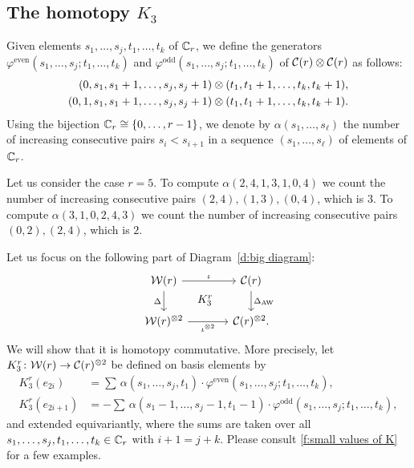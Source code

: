 \subsection{The homotopy $K_3$}\label{ss:coproduct}
\begin{definition}
    Given elements $s_1,\dots,s_j,t_1,\dots,t_k$ of $\mathbb{C}_r$, we define the generators $\varphi^{\mathrm{even}}(s_1,\dots,s_j;t_1,\dots,t_k)$ and $\varphi^{\mathrm{odd}}(s_1,\dots,s_j;t_1,\dots,t_k)$ of $\mathcal{C}(r) \otimes \mathcal{C}(r)$ as follows:
\begin{align*}
 (0,s_1,s_1+1,\dots,s_j,s_j+1) &\otimes
(t_1,t_1+1,\dots,t_k,t_k+1),
\\
(0,1,s_1,s_1+1,\dots,s_j,s_j+1)&\otimes (t_1,t_1+1,\dots,t_k,t_k+1).
\end{align*}
Using the bijection $\mathbb{C}_r \cong \{0,\dots,r-1\}$, we denote by $\alpha(s_1,\dots,s_\ell)$ the number of increasing consecutive pairs $s_i < s_{i+1}$ in a sequence $(s_1,\ldots,s_\ell)$ of elements of $\mathbb{C}_r$.
\end{definition} 
\begin{example}
    Let us consider the case $r = 5$. To compute $\alpha(2,4,1,3,1,0,4)$ we count the number of increasing consecutive pairs $(2,4),(1,3),(0,4)$, which is $3$. To compute $\alpha(3,1,0,2,4,3)$ we count the number of increasing consecutive pairs $(0,2),(2,4)$, which is $2$.
\end{example}

Let us focus on the following part of Diagram~\eqref{d:big diagram}:
\[
\begin{tikzcd}[column sep=large]
	\cW(r) \arrow[r,"\iota"] \arrow[d,"\Delta"'] \arrow[dr,phantom,"K^r_3"]&
	\cC(r) \arrow[d,"\Delta_{\AW}"] \\
	\cW(r)^{\ot 2} \arrow[r,"\iota^{\ot 2}"'] &
	\cC(r)^{\ot 2}.
\end{tikzcd}
\]
We will show that it is homotopy commutative.
More precisely, let $K_3^r \colon \mathcal{W}(r) \to \mathcal{C}(r)^{\otimes 2}$ be defined on basis elements by
\[
\begin{split}
	K_3^r(e_{2i}) &= \sum \, \alpha(s_1,\ldots,s_j,t_1)\cdot\varphi^{\mathrm{even}}(s_1,\dots,s_j;t_1,\dots,t_k), \\
	K_3^r(e_{2i+1}) &= -\sum \, \alpha(s_1-1,\ldots,s_j-1,t_1-1)\cdot \varphi^{\mathrm{odd}}(s_1,\dots,s_j;t_1,\dots,t_k),
\end{split}
\]
and extended equivariantly, where the sums are taken over all $s_1,\dots,s_j,t_1,\dots,t_k \in \mathbb{C}_r$ with $i+1 = j+k$.
Please consult \cref{f:small values of K} for a few examples.


